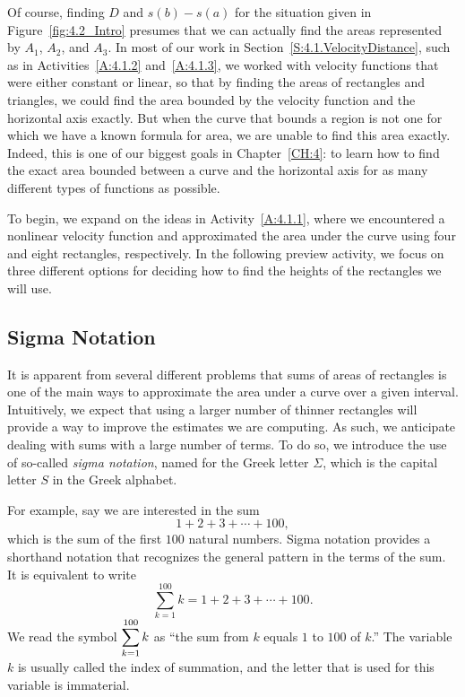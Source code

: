 Of course, finding $D$ and $s(b)-s(a)$ for the situation given in Figure~\ref{fig:4.2_Intro} presumes that we can actually find the areas represented by $A_1$, $A_2$, and $A_3$.  In most of our work in Section~\ref{S:4.1.VelocityDistance}, such as in Activities~\ref{A:4.1.2} and~\ref{A:4.1.3}, we worked with velocity functions that were either constant or linear, so that by finding the areas of rectangles and triangles, we could find the area bounded by the velocity function and the horizontal axis exactly.  But when the curve that bounds a region is not one for which we have a known formula for area, we are unable to find this area exactly.  Indeed, this is one of our biggest goals in Chapter~\ref{CH:4}: to learn how to find the exact area bounded between a curve and the horizontal axis for as many different types of functions as possible.  

To begin, we expand on the ideas in Activity~\ref{A:4.1.1}, where we encountered a nonlinear velocity function and approximated the area under the curve using four and eight rectangles, respectively.  In the following preview activity, we focus on three different options for deciding how to find the heights of the rectangles we will use.


\subsection*{Sigma Notation}

It is apparent from several different problems that sums of areas of rectangles is one of the main ways to approximate the area under a curve over a given interval.  Intuitively, we expect that using a larger number of thinner rectangles will provide a way to improve the estimates we are computing.  As such, we anticipate dealing with sums with a large number of terms.  To do so, we introduce the use of so-called \emph{sigma notation}, named for the Greek letter $\Sigma$, which is the capital letter $S$ in the Greek alphabet.

For example, say we are interested in the sum
\[ 1 + 2 + 3 + \cdots + 100, \]
which is the sum of the first $100$ natural numbers.  Sigma notation provides a shorthand notation that recognizes the general pattern in the terms of the sum.  It is equivalent to write
\[ \sum_{k=1}^{100} k =  1 + 2 + 3 + \cdots + 100. \]
We read the symbol $\displaystyle \sum_{k=1}^{100} k$ as ``the sum from $k$ equals $1$ to $100$ of $k$.''  The variable $k$ is usually called the index of summation, and the letter that is used for this variable is immaterial.  

